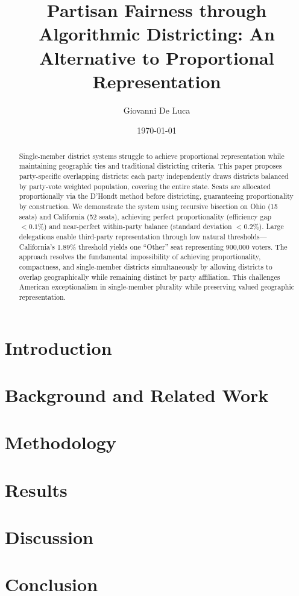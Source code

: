 \documentclass[11pt]{article}
\title{Partisan Fairness through Algorithmic Districting: An Alternative to Proportional Representation}
\author{Giovanni De Luca}
\date{\today}
\begin{document}
\maketitle

\begin{abstract}
Single-member district systems struggle to achieve proportional representation while maintaining geographic ties and traditional districting criteria. This paper proposes party-specific overlapping districts: each party independently draws districts balanced by party-vote weighted population, covering the entire state. Seats are allocated proportionally via the D'Hondt method before districting, guaranteeing proportionality by construction. We demonstrate the system using recursive bisection on Ohio (15 seats) and California (52 seats), achieving perfect proportionality (efficiency gap $< 0.1\%$) and near-perfect within-party balance (standard deviation $< 0.2\%$). Large delegations enable third-party representation through low natural thresholds---California's 1.89\% threshold yields one ``Other'' seat representing 900,000 voters. The approach resolves the fundamental impossibility of achieving proportionality, compactness, and single-member districts simultaneously by allowing districts to overlap geographically while remaining distinct by party affiliation. This challenges American exceptionalism in single-member plurality while preserving valued geographic representation.
\end{abstract}

\section{Introduction}


\section{Background and Related Work}


\section{Methodology}


\section{Results}


\section{Discussion}


\section{Conclusion}



\end{document}
